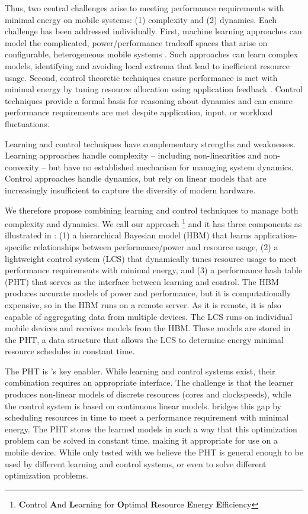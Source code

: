 Thus, two central challenges arise to meeting performance requirements
with minimal energy on mobile systems: (1) complexity and (2)
dynamics.  Each challenge has been addressed individually.  First,
machine learning approaches can model the complicated,
power/performance tradeoff spaces that arise on configurable,
heterogeneous mobile systems
\cite{dubach2010,Bitirgen2008,Ipek,Koala,LEO,Flicker,Ponamarev}.  Such
approaches can learn complex models, identifying and avoiding local
extrema that lead to inefficient resource usage.  Second, control
theoretic techniques ensure performance is met with minimal energy by
tuning resource allocation using application feedback
\cite{Wu2004,Chen2011,PTRADE,POET,ControlWare,Agilos,grace2}.  Control
techniques provide a formal basis for reasoning about dynamics and can
ensure performance requirements are met despite application, input, or
workload fluctuations.

Learning and control techniques have complementary strengths and
weaknesses.  Learning approaches handle complexity -- including
non-linearities and non-convexity -- but have no established mechanism
for managing system dynamics.  Control approaches handle dynamics, but
rely on linear models that are increasingly insufficient to capture
the diversity of modern hardware.

We therefore propose combining learning and control techniques to
manage both complexity and dynamics.  We call our approach
\SYSTEM{}\footnote{\textbf{C}ontrol \textbf{A}nd \textbf{L}earning for
  \textbf{O}ptimal \textbf{R}esource \textbf{E}nergy
  \textbf{E}fficiency} and it has three components as illustrated in
: (1) a hierarchical Bayesian model (HBM) that learns
application-specific relationships between performance/power and
resource usage, (2) a lightweight control system (LCS) that
dynamically tunes resource usage to meet performance requirements with
minimal energy, and (3) a performance hash table (PHT) that serves as
the interface between learning and control.  The HBM produces accurate
models of power and performance, but it is computationally expensive,
so in \SYSTEM{} the HBM runs on a remote server.  As it is remote, it
is also capable of aggregating data from multiple devices.  The LCS
runs on individual mobile devices and receives models from the HBM.
These models are stored in the PHT, a data structure that allows the
LCS to determine energy minimal resource schedules in constant time.


The PHT is \SYSTEM{}'s key enabler.  While learning and control
systems exist, their combination requires an appropriate interface.
The challenge is that the learner produces non-linear models of
discrete resources (\eg cores and clockspeeds), while the control
system is based on continuous linear models.  \SYSTEM{} bridges this
gap by scheduling resources in time to meet a performance requirement
with minimal energy.  The PHT stores the learned models in such a way
that this optimization problem can be solved in constant time, making
it appropriate for use on a mobile device.  While only tested with
\SYSTEM{} we believe the PHT is general enough to be used by different
learning and control systems, or even to solve different optimization
problems.


